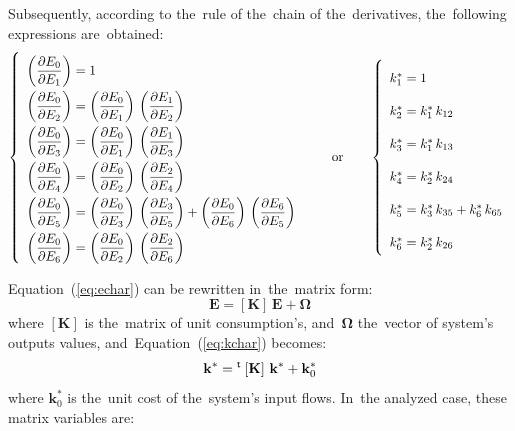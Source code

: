 \documentclass[energies,article,accept,moreauthors,pdftex]{Definitions/mdpi}
\newcommand{\vm}[1]{\ensuremath{\mathbf{#1}}}
\newcommand{\tm}{\ensuremath{\prescript{\smash{\mathsf{t}}}{}{\mskip1mu}}}
\newcommand{\dpartial}[2]{\left(\dfrac{\partial E_{#1}}{\partial E_{#2}}\right)}
\begin{document}
Subsequently, according to the~rule of the~chain of the~derivatives, the~following expressions are~obtained:
\begin{equation}
    \def\arraystretch{2.1}
    \left\{\begin{array}{l}
       \dpartial{0}{1}=1 \\
       \dpartial{0}{2}=\dpartial{0}{1}\,\dpartial{1}{2} \\
       \dpartial{0}{3}=\dpartial{0}{1}\,\dpartial{1}{3} \\
       \dpartial{0}{4}=\dpartial{0}{2}\,\dpartial{2}{4} \\
       \dpartial{0}{5}=\dpartial{0}{3}\,\dpartial{3}{5} + \dpartial{0}{6}\,\dpartial{6}{5} \\
       \dpartial{0}{6}=\dpartial{0}{2}\,\dpartial{2}{6} \\
    \end{array}\right.
    \qquad
    \text{or}
    \qquad
       \left\{\begin{array}{l}
        k_1^* = 1 \\
        k_2^* = k_1^*\,k_{12} \\
        k_3^* = k_1^*\,k_{13} \\
        k_4^* = k_2^*\,k_{24} \\
        k_5^* = k_3^*\,k_{35} + k_6^*\,k_{65} \\
        k_6^* = k_2^*\,k_{26} \\
    \end{array}\right.
    \label{eq:kgenplant}
\end{equation}

Equation~(\ref{eq:echar}) can be rewritten in~the~matrix form:
\begin{equation}
    \vm{E}=\left[\vm{K}\right]\,\vm{E}+\vm{\Omega}
    \label{eq:mechar}
\end{equation}
where $\left[\vm{K}\right]$ is the~matrix of unit consumption's, and~$\vm{\Omega}$ the~vector of system's outputs values, and~Equation~(\ref{eq:kchar}) becomes:
\begin{equation}
    \vm{k}^* = \tm\left[\vm{K}\right]\,\vm{k}^* + \vm{k}_0^*
    \label{eq:mkchar}
\end{equation}
where $\vm{k}_0^*$ is the~unit cost of the~system's input flows. In~the analyzed case, these matrix variables are:
\end{document}
